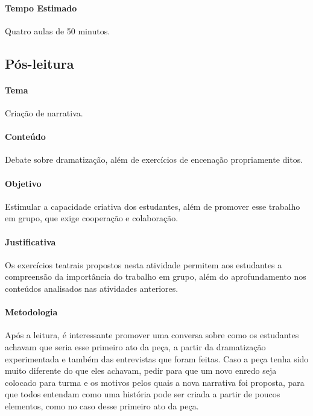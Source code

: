\documentclass[11pt]{extarticle}
\begin{document}
\paragraph{Tempo Estimado} Quatro aulas de 50 minutos. 

\subsection{Pós-leitura} 


\paragraph{Tema} Criação de narrativa. 

\paragraph{Conteúdo} Debate sobre dramatização, além de exercícios de encenação propriamente ditos. 

\paragraph{Objetivo} Estimular a capacidade criativa dos estudantes, além de promover esse trabalho em grupo, que exige cooperação e colaboração. 

\paragraph{Justificativa} Os exercícios teatrais propostos nesta atividade permitem aos estudantes a compreensão da importância do trabalho em grupo, além do aprofundamento nos conteúdos analisados nas atividades anteriores.   

\paragraph{Metodologia} Após a leitura, é interessante promover uma conversa sobre como os estudantes achavam que seria esse primeiro ato da peça, a partir da dramatização experimentada e também das entrevistas que foram feitas. Caso a peça tenha sido muito diferente do que eles achavam, pedir para que um novo enredo seja colocado para turma e os motivos pelos quais a nova narrativa foi proposta, para que todos entendam como uma história pode ser criada a partir de poucos elementos, como no caso desse primeiro ato da peça.
\end{document}
